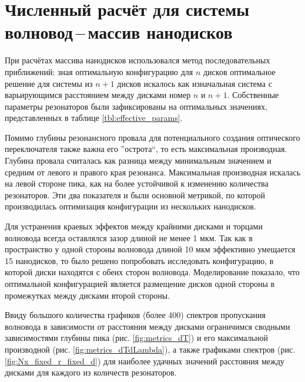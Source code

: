 \section{Численный расчёт для системы волновод\,--\,массив нанодисков}

При расчётах массива нанодисков использовался метод последовательных приближений: зная оптимальную конфигурацию для $n$ дисков оптимальное решение для системы из $n+1$ дисков искалось как изначальная система с варьирующимся расстоянием между дисками номер $n$ и $n+1$. Собственные параметры резонаторов были зафиксированы на оптимальных значениях, представленных в таблице \ref{tbl:effective_params}.

Помимо глубины резонансного провала для потенциального создания оптического переключателя также важна его ''острота``, то есть максимальная производная. Глубина провала считалась как разница между минимальным значением и средним от левого и правого края резонанса. Максимальная производная искалась на левой стороне пика, как на более устойчивой к изменению количества резонаторов. Эти два показателя и были основной метрикой, по которой производилась оптимизация конфигурации из нескольких нанодисков.

Для устранения краевых эффектов между крайними дисками и торцами волновода всегда оставлялся зазор длиной не менее 1 мкм. Так как в пространство у одной стороны волновода длиной 10 мкм эффективно умещается 15 нанодисков, то было решено попробовать исследовать конфигурацию, в которой диски находятся с обеих сторон волновода. Моделирование показало, что оптимальной конфигурацией является размещение дисков одной стороны в промежутках между дисками второй стороны.

Ввиду большого количества графиков (более 400) спектров пропускания волновода в зависимости от расстояния между дисками ограничимся сводными зависимостями глубины пика (рис. \ref{fig:metrics_dT}) и его максимальной производной (рис. \ref{fig:metrics_dTdLambda}), а также графиками спектров (рис. \ref{fig:Nx_fixed_r_fixed_d}) для наиболее удачных значений расстояния между дисками для каждого из количеств резонаторов.


